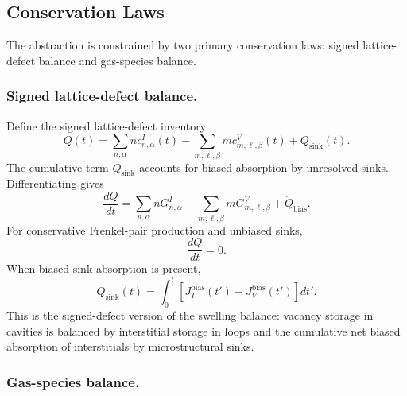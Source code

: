 \subsection{Conservation Laws}
\label{sec:general_conservation_laws}

The abstraction is constrained by two primary conservation laws: signed
lattice-defect balance and gas-species balance.

\subsubsection{Signed lattice-defect balance.}

Define the signed lattice-defect inventory
\begin{equation}
    Q(t)
    =
    \sum_{n,\alpha} n c^I_{n,\alpha}(t)
    -
    \sum_{m,\boldsymbol{\ell},\beta}
    m c^V_{m,\boldsymbol{\ell},\beta}(t)
    +
    Q_{\mathrm{sink}}(t) .
    \label{eq:signed_defect_inventory}
\end{equation}
The cumulative term $Q_{\mathrm{sink}}$ accounts for biased absorption by
unresolved sinks. Differentiating gives
\begin{equation}
    \frac{dQ}{dt}
    =
    \sum_{n,\alpha} n G^I_{n,\alpha}
    -
    \sum_{m,\boldsymbol{\ell},\beta} m G^V_{m,\boldsymbol{\ell},\beta}
    +
    \dot{Q}_{\mathrm{bias}} .
    \label{eq:signed_defect_balance}
\end{equation}
For conservative Frenkel-pair production and unbiased sinks,
\begin{equation}
    \frac{dQ}{dt}=0 .
\end{equation}
When biased sink absorption is present,
\begin{equation}
    Q_{\mathrm{sink}}(t)
    =
    \int_0^t
    \left[
    J_I^{\mathrm{bias}}(t')
    -
    J_V^{\mathrm{bias}}(t')
    \right]dt' .
    \label{eq:biased_sink_correction}
\end{equation}
This is the signed-defect version of the swelling balance: vacancy storage in
cavities is balanced by interstitial storage in loops and the cumulative net
biased absorption of interstitials by microstructural sinks.

\subsubsection{Gas-species balance.}

